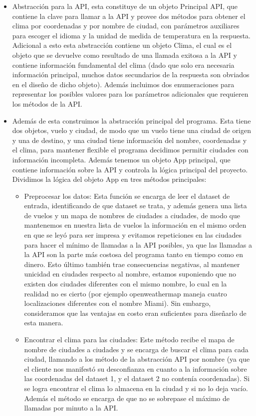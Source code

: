 \documentclass{report}
\begin{document}
\begin{itemize}
    \item Abstracción para la API, esta constituye de un objeto Principal API, que contiene la clave para llamar a la API y provee dos métodos para obtener el clima por coordenadas y por nombre de ciudad, con parámetros auxiliares para escoger el idioma y la unidad de medida de temperatura en la respuesta. Adicional a esto esta abstracción contiene un objeto Clima, el cual es el objeto que se devuelve como resultado de una llamada exitosa a la API y contiene información fundamental del clima (dado que solo era necesaria información principal, muchos datos secundarios de la respuesta son obviados en el diseño de dicho objeto). Además incluimos dos enumeraciones para representar los posibles valores para los parámetros adicionales que requieren los métodos de la API.
    \item Además de esta construimos la abstracción principal del programa. Esta tiene dos objetos, vuelo y ciudad, de modo que un vuelo tiene una ciudad de origen y una de destino, y una ciudad tiene información del nombre,
    coordenadas y el clima, para mantener flexible el programa decidimos permitir ciudades con información incompleta. Además tenemos un objeto App principal, que contiene información sobre la API y controla la lógica principal del proyecto. Dividimos la lógica del objeto App en tres métodos principales:
    \begin{itemize}
        \item Preprocesar los datos: Esta función se encarga de leer el dataset de entrada, identificando de que dataset se trata, y además genera una lista de vuelos y un mapa de nombres de ciudades a ciudades, de modo que mantenemos en nuestra lista de vuelos la información en el mismo orden en que se leyó para ser impresa y evitamos repeticiones en las ciudades para hacer el mínimo de llamadas a la API posibles, ya que las llamadas a la API son la parte más costosa del programa tanto en tiempo como en dinero. Esto último también trae consecuencias negativas, al mantener unicidad en ciudades respecto al nombre, estamos suponiendo que no existen dos ciudades diferentes con el mismo nombre, lo cual en la realidad no es cierto (por ejemplo openweathermap maneja cuatro localizaciones diferentes con el nombre Miami). Sin embargo, consideramos que las ventajas en costo eran suficientes para diseñarlo de esta manera.
        \item Encontrar el clima para las ciudades: Este método recibe el mapa de nombre de ciudades a ciudades y se encarga de buscar el clima para cada ciudad, llamando a los método de la abstracción API por nombre (ya que el cliente nos manifestó su desconfianza en cuanto a la información sobre las coordenadas del  dataset 1, y el dataset 2 no contenía coordenadas). Si se logra encontrar el clima lo almacena en la ciudad y si no lo deja vacío. Además el método se encarga de que no se sobrepase el máximo de llamadas por minuto a la API.

\end{itemize}
\end{itemize}
\end{document}
